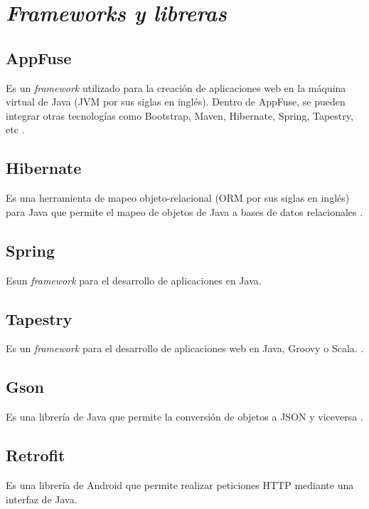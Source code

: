\section{\textit{Frameworks y libreras}} \label{Frameworks y librerias}

\subsection{AppFuse}
Es un \textit{framework} utilizado para la creación de aplicaciones web en la máquina virtual de Java (JVM por sus siglas en inglés). Dentro de AppFuse, se pueden integrar otras tecnologías como Bootstrap, Maven, Hibernate, Spring, Tapestry, etc \cite{APF1}.

\subsection{Hibernate}
Es una herramienta de mapeo objeto-relacional (ORM por sus siglas en inglés) para Java que permite el mapeo de objetos de Java a bases de datos relacionales \cite{HBR1}.

\subsection{Spring}
Esun \textit{framework} para el desarrollo de aplicaciones en Java.

\subsection{Tapestry}
Es un \textit{framework} para el desarrollo de aplicaciones web en Java, Groovy o Scala.  \cite{ATP1}.

\subsection{Gson}
Es una librería de Java que permite la conversión de objetos a JSON y viceversa \cite{GSN1}
.
\subsection{Retrofit}
Es una librería de Android que permite realizar peticiones HTTP mediante una interfaz de Java\cite{RFT1}.